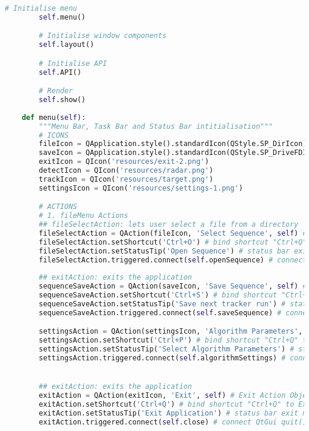 \begin{lstlisting}[language=Python, caption={GUI Impementation Code}, captionpos=b, label={lst:gui}]
        # Initialise menu
        self.menu() 

        # Initialise window components
        self.layout()

        # Initialise API
        self.API()

        # Render
        self.show()
             
    def menu(self):               
        """Menu Bar, Task Bar and Status Bar intitialisation"""     
        # ICONS
        fileIcon = QApplication.style().standardIcon(QStyle.SP_DirIcon)
        saveIcon = QApplication.style().standardIcon(QStyle.SP_DriveFDIcon)
        exitIcon = QIcon('resources/exit-2.png')
        detectIcon = QIcon('resources/radar.png')
        trackIcon = QIcon('resources/target.png')
        settingsIcon = QIcon('resources/settings-1.png')

        # ACTIONS        
        # 1. fileMenu Actions
        ## fileSelectAction: lets user select a file from a directory 
        fileSelectAction = QAction(fileIcon, 'Select Sequence', self) # Exit Action Object
        fileSelectAction.setShortcut('Ctrl+O') # bind shortcut "Ctrl+Q" to Exit Button
        fileSelectAction.setStatusTip('Open Sequence') # status bar exit message
        fileSelectAction.triggered.connect(self.openSequence) # connect QtGui quit() method 
        
        ## exitAction: exits the application
        sequenceSaveAction = QAction(saveIcon, 'Save Sequence', self) # Exit Action Object
        sequenceSaveAction.setShortcut('Ctrl+S') # bind shortcut "Ctrl+Q" to Exit Button
        sequenceSaveAction.setStatusTip('Save next tracker run') # status bar exit message
        sequenceSaveAction.triggered.connect(self.saveSequence) # connect QtGui quit() method  

        settingsAction = QAction(settingsIcon, 'Algorithm Parameters', self) # Exit Action Object
        settingsAction.setShortcut('Ctrl+P') # bind shortcut "Ctrl+Q" to Exit Button
        settingsAction.setStatusTip('Select Algorithm Parameters') # status bar exit message
        settingsAction.triggered.connect(self.algorithmSettings) # connect QtGui quit() method  


        ## exitAction: exits the application
        exitAction = QAction(exitIcon, 'Exit', self) # Exit Action Object
        exitAction.setShortcut('Ctrl+Q') # bind shortcut "Ctrl+Q" to Exit Button
        exitAction.setStatusTip('Exit Application') # status bar exit message
        exitAction.triggered.connect(self.close) # connect QtGui quit() method 
        

\end{lstlisting}
